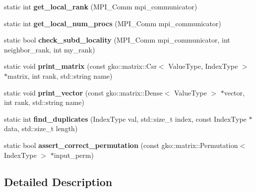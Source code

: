 \begin{DoxyCompactItemize}
\item 
\mbox{\label{structSchwarzWrappers_1_1Utils_aa4a82faaa7114b904af8158ada9bf337}} 
static int {\bfseries get\+\_\+local\+\_\+rank} (M\+P\+I\+\_\+\+Comm mpi\+\_\+communicator)
\item 
\mbox{\label{structSchwarzWrappers_1_1Utils_a0713c4deca73d515f774513d52dd0ca0}} 
static int {\bfseries get\+\_\+local\+\_\+num\+\_\+procs} (M\+P\+I\+\_\+\+Comm mpi\+\_\+communicator)
\item 
\mbox{\label{structSchwarzWrappers_1_1Utils_a43efc30e0a0630fb3ee4d7ca2223b3a4}} 
static bool {\bfseries check\+\_\+subd\+\_\+locality} (M\+P\+I\+\_\+\+Comm mpi\+\_\+communicator, int neighbor\+\_\+rank, int my\+\_\+rank)
\item 
\mbox{\label{structSchwarzWrappers_1_1Utils_abb03830c457ae2350d52718ceecf881e}} 
static void {\bfseries print\+\_\+matrix} (const gko\+::matrix\+::\+Csr$<$ Value\+Type, Index\+Type $>$ $\ast$matrix, int rank, std\+::string name)
\item 
\mbox{\label{structSchwarzWrappers_1_1Utils_ab1977b70bd10de02005a17f6e1808fdc}} 
static void {\bfseries print\+\_\+vector} (const gko\+::matrix\+::\+Dense$<$ Value\+Type $>$ $\ast$vector, int rank, std\+::string name)
\item 
\mbox{\label{structSchwarzWrappers_1_1Utils_a065614d559b2fc25067a63e3f9866a3f}} 
static int {\bfseries find\+\_\+duplicates} (Index\+Type val, std\+::size\+\_\+t index, const Index\+Type $\ast$data, std\+::size\+\_\+t length)
\item 
\mbox{\label{structSchwarzWrappers_1_1Utils_a9866f6cc5908abe5337e2138b023ded6}} 
static bool {\bfseries assert\+\_\+correct\+\_\+permutation} (const gko\+::matrix\+::\+Permutation$<$ Index\+Type $>$ $\ast$input\+\_\+perm)
\end{DoxyCompactItemize}


\subsection{Detailed Description}
